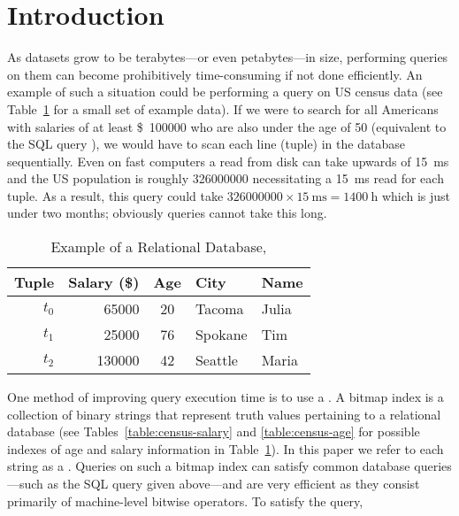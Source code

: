 \section{Introduction}
As datasets grow to be terabytes---or even petabytes---in size, performing
queries on them can become prohibitively time-consuming if not done
efficiently. An example of such a situation could be performing a query on US
census data (see Table~\ref{table:census-relational} for a small set of example
data). If we were to search for all Americans with salaries of at least
\SI{100000}[\$]{} who are also under the age of 50 (equivalent to the SQL query
), we would have to scan each
line (tuple) in the database sequentially. Even on fast computers a read from
disk can take upwards of \SI{15}{\milli\second} and the US population is
roughly \num{326000000} necessitating a \SI{15}{\milli\second} read for each tuple. As a result, this query could take
\(\num{326 000 000} \times \SI{15}{\milli\second} = \SI{1400}{\hour}\)
which is just under two months; obviously queries cannot take this long.
\begin{table}[H]
    \centering
    \caption{Example of a Relational Database, }
    \label{table:census-relational}
    \begin{tabular}{@{}r||rcll@{}}
        \toprule
        Tuple   & Salary (\$)  & Age & City    & Name  \\
        \midrule
        \(t_0\) & \num{65000}  & 20  & Tacoma  & Julia \\
        \(t_1\) & \num{25000}  & 76  & Spokane & Tim   \\
        \(t_2\) & \num{130000} & 42  & Seattle & Maria \\
        \bottomrule
    \end{tabular}
\end{table}
\par
One method of improving query execution time is to use a . A
bitmap index is a collection of binary strings that represent truth values
pertaining to a relational database (see Tables~\ref{table:census-salary} and
\ref{table:census-age} for possible indexes of age and salary information in
Table~\ref{table:census-relational}).  In this paper we refer to each string as
a . Queries on such a bitmap index can satisfy common
database queries---such as the SQL query given above---and are very efficient
as they consist primarily of machine-level bitwise operators. To satisfy the query,
